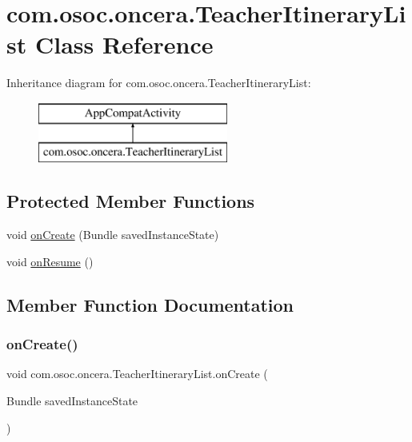\hypertarget{classcom_1_1osoc_1_1oncera_1_1_teacher_itinerary_list}{}\section{com.\+osoc.\+oncera.\+Teacher\+Itinerary\+List Class Reference}
\label{classcom_1_1osoc_1_1oncera_1_1_teacher_itinerary_list}
Inheritance diagram for com.\+osoc.\+oncera.\+Teacher\+Itinerary\+List\+:\begin{figure}[H]
\begin{center}
\leavevmode
\includegraphics[height=2.000000cm]{classcom_1_1osoc_1_1oncera_1_1_teacher_itinerary_list}
\end{center}
\end{figure}
\subsection*{Protected Member Functions}
\begin{DoxyCompactItemize}
\item 
void \mbox{\hyperlink{classcom_1_1osoc_1_1oncera_1_1_teacher_itinerary_list_a594d6b94da908f76f4af06461e53944b}{on\+Create}} (Bundle saved\+Instance\+State)
\item 
void \mbox{\hyperlink{classcom_1_1osoc_1_1oncera_1_1_teacher_itinerary_list_a1c7491a73b1826b4f899ceae5713057a}{on\+Resume}} ()
\end{DoxyCompactItemize}


\subsection{Member Function Documentation}
\mbox{\label{classcom_1_1osoc_1_1oncera_1_1_teacher_itinerary_list_a594d6b94da908f76f4af06461e53944b}} 
\subsubsection{\texorpdfstring{onCreate()}{onCreate()}}
{\footnotesize\ttfamily void com.\+osoc.\+oncera.\+Teacher\+Itinerary\+List.\+on\+Create (\begin{DoxyParamCaption}\item[{Bundle}]{saved\+Instance\+State }\end{DoxyParamCaption})\hspace{0.3cm}{\ttfamily [protected]}}

